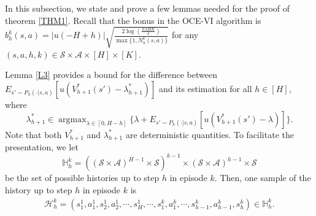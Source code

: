 \documentclass[11pt]{article}
\newcommand{\1}{\mathbbm{1}}
\begin{document}
In this subsection, we state and prove a few lemmas needed for the proof of theorem \ref{THM1}. Recall that the bonus in the OCE-VI algorithm is $b_h^k(s,a)=\vert u(-H+h)\vert\sqrt{\frac{2\log\left (\frac{SAHK}{\delta}\right )}{\max\{1,N^k_h(s,a)\}}}$ for any $(s,a,h,k)\in \mathcal{S}\times \mathcal{A}\times [H]\times [K]$. %

Lemma \ref{L3} provides a bound for the difference between $E_{s'\sim P_h(\cdot\vert s,a)}\left [u(V_{h+1}^*(s')-\lambda_{h+1}^*)\right ]$ and its estimation for all $h\in [H]$, where $$\lambda_{h+1}^*\in \mathop{\arg\max}_{\lambda\in [0,H-h]}\{\lambda+E_{s'\sim P_h(\cdot\vert s,a)}[u(V_{h+1}^*(s')-\lambda)]\}.$$ 
Note that both $V_{h+1}^*$ and $\lambda_{h+1}^*$ are deterministic quantities. To facilitate the presentation, we let 
\begin{equation}\label{HIST}
\mathbb{H}_h^k=((\mathcal{S}\times \mathcal{A})^{H-1}\times \mathcal{S})^{k-1}\times(\mathcal{S}\times\mathcal{A})^{h-1}\times\mathcal{S}
\end{equation}
be the set of possible histories up to step $h$ in episode $k$. Then, one sample of the history up to step $h$ in episode $k$ is
\begin{align*}
\mathcal{H}_h^k=(s_1^1,a_1^1,s_2^1,a_2^1,\cdots,s_H^1,\cdots,s_1^k,a_1^k,\cdots,s_{h-1}^k,a_{h-1}^k,s_h^k)\in \mathbb{H}_h^k.
\end{align*}
\end{document}
